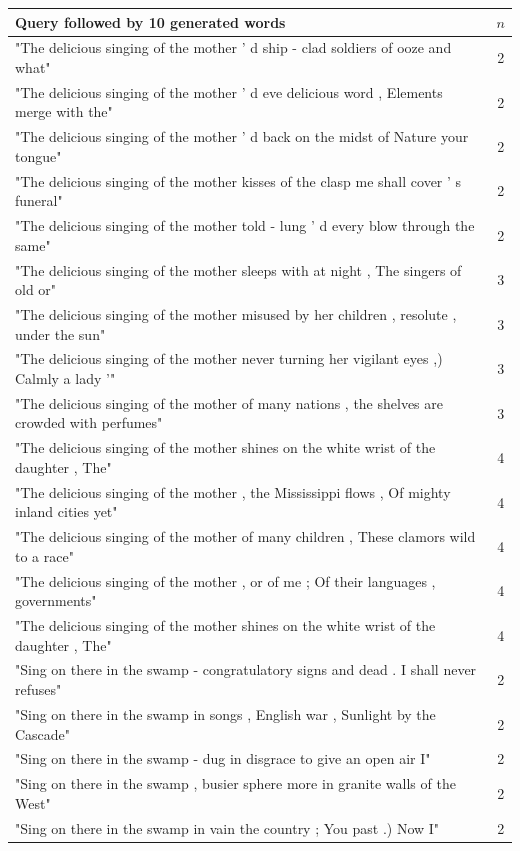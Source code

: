 \documentclass[a4paper,12pt]{article}
\begin{document}
\begin{table}
\small
\begin{tabular}{| l |c|}
\hline
Query followed by 10 generated words & $n$ \\ \hline
"The delicious singing of the mother ' d ship - clad soldiers of ooze and what" & 2\\ \hline
"The delicious singing of the mother ' d eve delicious word , Elements merge with the"& 2 \\ \hline
"The delicious singing of the mother ' d back on the midst of Nature your tongue" & 2 \\ \hline
"The delicious singing of the mother kisses of the clasp me shall cover ' s funeral" & 2 \\ \hline
"The delicious singing of the mother told - lung ' d every blow through the same" & 2 \\ \hline

"The delicious singing of the mother sleeps with at night , The singers of old or" & 3 \\ \hline
"The delicious singing of the mother misused by her children , resolute , under the sun" & 3 \\ \hline
"The delicious singing of the mother never turning her vigilant eyes ,) Calmly a lady '" & 3 \\ \hline
"The delicious singing of the mother of many nations , the shelves are crowded with perfumes" & 3 \\ \hline

"The delicious singing of the mother shines on the white wrist of the daughter , The" & 4 \\ \hline
"The delicious singing of the mother , the Mississippi flows , Of mighty inland cities yet" & 4 \\ \hline
"The delicious singing of the mother of many children , These clamors wild to a race" & 4 \\ \hline
"The delicious singing of the mother , or of me ; Of their languages , governments" & 4 \\ \hline
"The delicious singing of the mother shines on the white wrist of the daughter , The" & 4 \\ \hline

"Sing on there in the swamp - congratulatory signs and dead . I shall never refuses" & 2\\ \hline
"Sing on there in the swamp in songs , English war , Sunlight by the Cascade"& 2 \\ \hline
"Sing on there in the swamp - dug in disgrace to give an open air I" & 2 \\ \hline
"Sing on there in the swamp , busier sphere more in granite walls of the West" & 2 \\ \hline
"Sing on there in the swamp in vain the country ; You past .) Now I" & 2 \\ \hline


\end{tabular}
\end{table}
\end{document}

